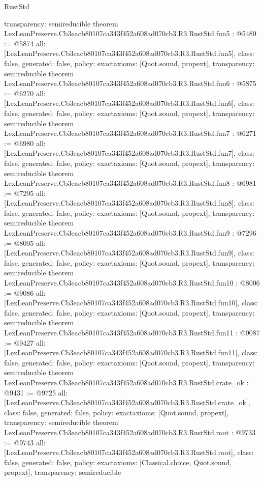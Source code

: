 \begin{lexlean}{RustStd}
\begin{coremodule}
{  transparency: semireducible
}
theorem LexLeanPreserve.Cb3eacb80107ca343f452a608ad070cb3.R3.RustStd.fun5 : @5480 := @5874 {
  all: [LexLeanPreserve.Cb3eacb80107ca343f452a608ad070cb3.R3.RustStd.fun5],
  class: false,
  generated: false,
  policy: exact{axioms: [Quot.sound, propext]},
  transparency: semireducible
}
theorem LexLeanPreserve.Cb3eacb80107ca343f452a608ad070cb3.R3.RustStd.fun6 : @5875 := @6270 {
  all: [LexLeanPreserve.Cb3eacb80107ca343f452a608ad070cb3.R3.RustStd.fun6],
  class: false,
  generated: false,
  policy: exact{axioms: [Quot.sound, propext]},
  transparency: semireducible
}
theorem LexLeanPreserve.Cb3eacb80107ca343f452a608ad070cb3.R3.RustStd.fun7 : @6271 := @6980 {
  all: [LexLeanPreserve.Cb3eacb80107ca343f452a608ad070cb3.R3.RustStd.fun7],
  class: false,
  generated: false,
  policy: exact{axioms: [Quot.sound, propext]},
  transparency: semireducible
}
theorem LexLeanPreserve.Cb3eacb80107ca343f452a608ad070cb3.R3.RustStd.fun8 : @6981 := @7295 {
  all: [LexLeanPreserve.Cb3eacb80107ca343f452a608ad070cb3.R3.RustStd.fun8],
  class: false,
  generated: false,
  policy: exact{axioms: [Quot.sound, propext]},
  transparency: semireducible
}
theorem LexLeanPreserve.Cb3eacb80107ca343f452a608ad070cb3.R3.RustStd.fun9 : @7296 := @8005 {
  all: [LexLeanPreserve.Cb3eacb80107ca343f452a608ad070cb3.R3.RustStd.fun9],
  class: false,
  generated: false,
  policy: exact{axioms: [Quot.sound, propext]},
  transparency: semireducible
}
theorem LexLeanPreserve.Cb3eacb80107ca343f452a608ad070cb3.R3.RustStd.fun10 : @8006 := @9086 {
  all: [LexLeanPreserve.Cb3eacb80107ca343f452a608ad070cb3.R3.RustStd.fun10],
  class: false,
  generated: false,
  policy: exact{axioms: [Quot.sound, propext]},
  transparency: semireducible
}
theorem LexLeanPreserve.Cb3eacb80107ca343f452a608ad070cb3.R3.RustStd.fun11 : @9087 := @9427 {
  all: [LexLeanPreserve.Cb3eacb80107ca343f452a608ad070cb3.R3.RustStd.fun11],
  class: false,
  generated: false,
  policy: exact{axioms: [Quot.sound, propext]},
  transparency: semireducible
}
theorem LexLeanPreserve.Cb3eacb80107ca343f452a608ad070cb3.R3.RustStd.crate_ok : @9431 := @9725 {
  all: [LexLeanPreserve.Cb3eacb80107ca343f452a608ad070cb3.R3.RustStd.crate_ok],
  class: false,
  generated: false,
  policy: exact{axioms: [Quot.sound, propext]},
  transparency: semireducible
}
theorem LexLeanPreserve.Cb3eacb80107ca343f452a608ad070cb3.R3.RustStd.root : @9733 := @9743 {
  all: [LexLeanPreserve.Cb3eacb80107ca343f452a608ad070cb3.R3.RustStd.root],
  class: false,
  generated: false,
  policy: exact{axioms: [Classical.choice, Quot.sound, propext]},
  transparency: semireducible
}


\end{coremodule}
\end{lexlean}
